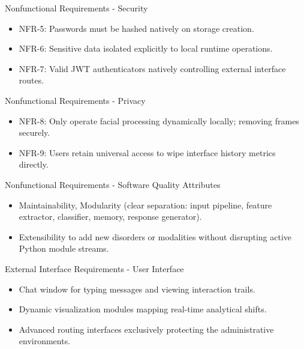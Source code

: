 \documentclass[11pt]{beamer}
\begin{document}
\begin{frame}{Nonfunctional Requirements - Security}
\begin{itemize}
    \item NFR-5: Passwords must be hashed natively on storage creation.
    \item NFR-6: Sensitive data isolated explicitly to local runtime operations.
    \item NFR-7: Valid JWT authenticators natively controlling external interface routes.
\end{itemize}
\end{frame}

\begin{frame}{Nonfunctional Requirements - Privacy}
\begin{itemize}
    \item NFR-8: Only operate facial processing dynamically locally; removing frames securely.
    \item NFR-9: Users retain universal access to wipe interface history metrics directly.
\end{itemize}
\end{frame}

\begin{frame}{Nonfunctional Requirements - Software Quality Attributes}
\begin{itemize}
    \item Maintainability, Modularity (clear separation: input pipeline, feature extractor, classifier, memory, response generator).
    \item Extensibility to add new disorders or modalities without disrupting active Python module streams.
\end{itemize}
\end{frame}


\begin{frame}{External Interface Requirements - User Interface}
\begin{itemize}
    \item Chat window for typing messages and viewing interaction trails.
    \item Dynamic visualization modules mapping real-time analytical shifts.
    \item Advanced routing interfaces exclusively protecting the administrative environments.
\end{itemize}
\end{frame}
\end{document}
